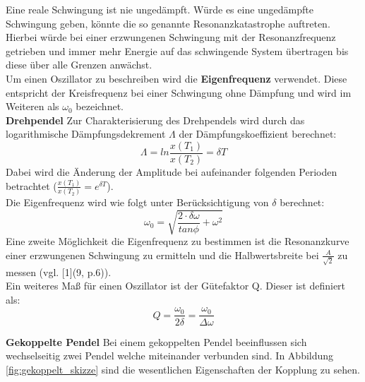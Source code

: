 \documentclass[12pt,a4paper]{article}
\begin{document}
\begin{multicols}{2}
Eine reale Schwingung ist nie ungedämpft. Würde es eine ungedämpfte Schwingung geben, könnte die so genannte Resonanzkatastrophe auftreten. Hierbei würde bei einer erzwungenen Schwingung mit der Resonanzfrequenz getrieben und immer mehr Energie auf das schwingende System übertragen bis diese über alle Grenzen anwächst.\\
Um einen Oszillator zu beschreiben wird die \textbf{Eigenfrequenz} verwendet. Diese entspricht der Kreisfrequenz bei einer Schwingung ohne Dämpfung und wird im Weiteren als $\omega_0$ bezeichnet.\\

\textbf{Drehpendel}
Zur Charakterisierung des Drehpendels wird durch das logarithmische Dämpfungsdekrement $\Lambda$ der Dämpfungskoeffizient berechnet:
$$\Lambda = ln \frac{x(T_1)}{x(T_2)} = \delta T$$
Dabei wird die Änderung der Amplitude bei aufeinander folgenden Perioden betrachtet ($\frac{x(T_1)}{x(T_2)} = e^{\delta T}$).\\
Die Eigenfrequenz wird wie folgt unter Berücksichtigung von $\delta$ berechnet:
$$ \omega_0 = \sqrt{\frac{2\cdot \delta \omega}{tan \phi} + \omega^2 }$$
Eine zweite Möglichkeit die Eigenfrequenz zu bestimmen ist die Resonanzkurve einer erzwungenen Schwingung zu ermitteln und die Halbwertsbreite bei $\frac{A}{\sqrt{2}}$ zu messen (vgl. [1](9, p.6)).\\
Ein weiteres Maß für einen Oszillator ist der Gütefaktor Q. Dieser ist definiert als:
$$Q = \frac{\omega_0}{2\delta} = \frac{\omega_0}{\Delta \omega}$$

\textbf{Gekoppelte Pendel}
Bei einem gekoppelten Pendel beeinflussen sich wechselseitig zwei Pendel welche miteinander verbunden sind. In Abbildung \ref{fig:gekoppelt_skizze} sind die wesentlichen Eigenschaften der Kopplung zu sehen.


\end{multicols}
\end{document}
